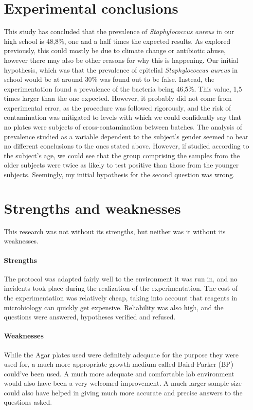 \section{Experimental conclusions}
This study has concluded that the prevalence of \emph{Staphylococcus aureus} in our high school is 48,8\%, one and a half times the expected results. As explored previously, this could mostly be due to climate change or antibiotic abuse, however there may also be other reasons for why this is happening. Our initial hypothesis, which was that the prevalence of epitelial \emph{Staphylococcus aureus} in school would be at around 30\% was found out to be false. Instead, the experimentation found a prevalence of the bacteria being 46,5\%. This value, 1,5 times larger than the one expected. However, it probably did not come from experimental error, as the procedure was followed rigorously, and the risk of contamination was mitigated to levels with which we could confidently say that no plates were subjects of cross-contamination between batches.\newline
The analysis of prevalence studied as a variable dependent to the subject's gender seemed to bear no different conclusions to the ones stated above. However, if studied according to the subject's age, we could see that the group comprising the samples from the older subjects were twice as likely to test positive than those from the younger subjects. Seemingly, my initial hypothesis for the second question was wrong.
\section{Strengths and weaknesses}
This research was not without its strengths, but neither was it without its weaknesses.
\paragraph{Strengths} The protocol was adapted fairly well to the environment it was run in, and no incidents took place during the realization of the experimentation. The cost of the experimentation was relatively cheap, taking into account that reagents in microbiology can quickly get expensive. Reliability was also high, and the questions were answered, hypotheses verified and refused.
\paragraph{Weaknesses} While the Agar plates used were definitely adequate for the purpose they were used for, a much more appropriate growth medium called Baird-Parker (BP) could've been used. A much more adequate and comfortable lab environment would also have been a very welcomed improvement. A much larger sample size could also have helped in giving much more accurate and precise answers to the questions asked.
